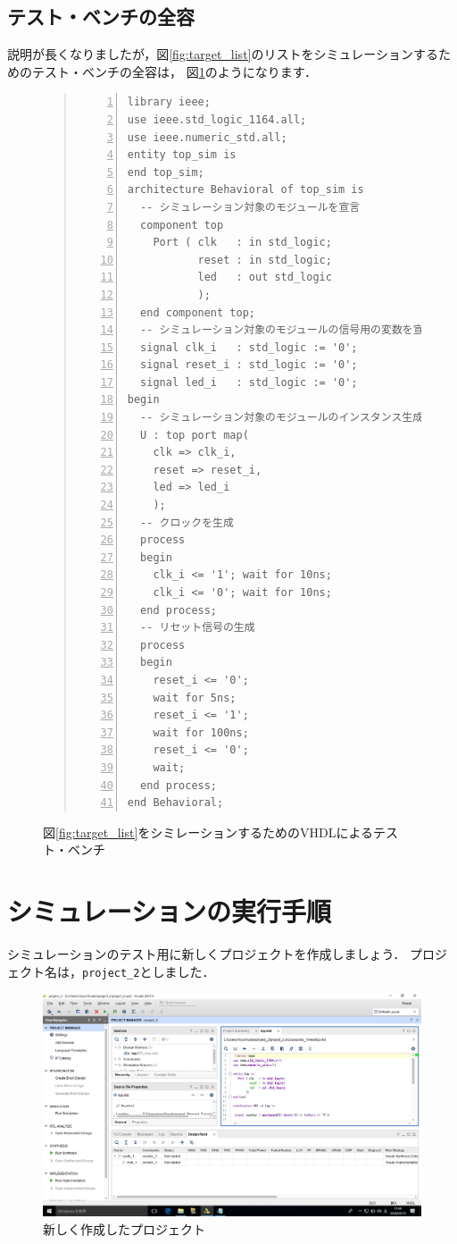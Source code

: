 \documentclass[a4paper,dvipdfmx]{jsarticle}
\begin{document}
\subsection{テスト・ベンチの全容}

説明が長くなりましたが，図\ref{fig:target_list}のリストをシミュレーションするためのテスト・ベンチの全容は，
図\ref{fig:simulation_list}のようになります．

\begin{figure}[H]
\begin{quote}
\begin{Verbatim}[frame=single, numbers=left, baselinestretch=0.8]
library ieee;
use ieee.std_logic_1164.all;
use ieee.numeric_std.all;
entity top_sim is
end top_sim;
architecture Behavioral of top_sim is
  -- シミュレーション対象のモジュールを宣言
  component top
    Port ( clk   : in std_logic;
           reset : in std_logic;
           led   : out std_logic
           );
  end component top;
  -- シミュレーション対象のモジュールの信号用の変数を宣言
  signal clk_i   : std_logic := '0';
  signal reset_i : std_logic := '0';
  signal led_i   : std_logic := '0';
begin
  -- シミュレーション対象のモジュールのインスタンス生成
  U : top port map(
    clk => clk_i,
    reset => reset_i,
    led => led_i
    );
  -- クロックを生成
  process
  begin
    clk_i <= '1'; wait for 10ns;
    clk_i <= '0'; wait for 10ns;
  end process;
  -- リセット信号の生成
  process
  begin
    reset_i <= '0';
    wait for 5ns;
    reset_i <= '1';
    wait for 100ns;
    reset_i <= '0';
    wait;
  end process;
end Behavioral;
\end{Verbatim}
\end{quote}
\caption{図\ref{fig:target_list}をシミレーションするためのVHDLによるテスト・ベンチ\label{fig:simulation_list}}
\end{figure}

\section{シミュレーションの実行手順}

シミュレーションのテスト用に新しくプロジェクトを作成しましょう．
プロジェクト名は，\verb|project_2|としました．

 \begin{figure}[H]
  \begin{center}
   \includegraphics[width=.8\textwidth]{chapter04_figures/VirtualBox_Windows10_19_03_2018_11_59_40.png}
  \end{center}
  \caption{新しく作成したプロジェクト}
 \end{figure}
\end{document}
